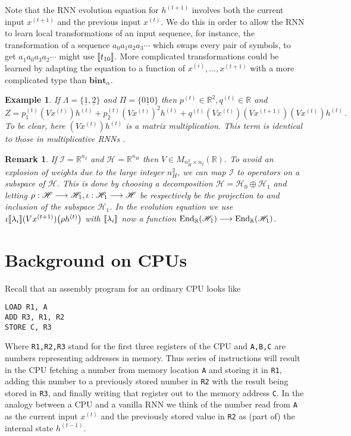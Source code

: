 \documentclass[english,letter paper,12pt,leqno]{article}
\theoremstyle{example}
\newtheorem{example}[theorem]{Example}
\newtheorem{remark}[theorem]{Remark}
\numberwithin{equation}{section}
\DeclareMathOperator{\End}{End}
\begin{document}
Note that the RNN evolution equation for $h^{(t+1)}$ involves both the current input $x^{(t+1)}$ and the previous input $x^{(t)}$. We do this in order to allow the RNN to learn local transformations of an input sequence, for instance, the transformation of a sequence $a_0 a_1 a_2 a_3 \cdots$ which swaps every pair of symbols, to get $a_1 a_0 a_3 a_2 \cdots$ might use $\llbracket t_{10} \rrbracket$. More complicated transformations could be learned by adapting the equation to a function of $x^{(i)}, \ldots, x^{(t+1)}$ with a more complicated type than $\textbf{bint}_\alpha$.

\begin{example} If $\Lambda = \{ \underline{1}, \underline{2} \}$ and $\Pi = \{ \underline{010} \}$ then $p^{(t)} \in \mathbb{R}^2, q^{(t)} \in \mathbb{R}$ and
\[
Z = p_1^{(t)}( V x^{(t)} )h^{(t)} + p_2^{(t)} ( V x^{(t)} )^2 h^{(t)} + q^{(t)} (Vx^{(t)})(Vx^{(t+1)})(Vx^{(t)})h^{(t)}\,.
\]
To be clear, here $(Vx^{(t)}) h^{(t)}$ is a matrix multiplication. This term is identical to those in multiplicative RNNs \cite{??}.
\end{example}

\begin{remark} If $\mathscr{I} = \mathbb{R}^{n_I}$ and $\mathscr{H} = \mathbb{R}^{n_H}$ then $V \in M_{n_H^2 \times n_I}(\mathbb{R})$. To avoid an explosion of weights due to the large integer $n_H^2$, we can map $\mathscr{I}$ to operators on a subspace of $\mathscr{H}$. This is done by choosing a decomposition $\mathscr{H} = \mathscr{H}_0 \oplus \mathscr{H}_1$ and letting $\rho: \mathscr{H} \longrightarrow \mathscr{H}_1, \iota: \mathscr{H}_1 \longrightarrow \mathscr{H}$ be respectively be the projection to and inclusion of the subspace $\mathscr{H}_1$. In the evolution equation we use $\iota \llbracket \lambda_i \rrbracket( Vx^{(t+1)} )\big( \rho h^{(t)} \big)$ with $\llbracket \lambda_i \rrbracket$ now a function $\End_{\mathbb{R}}(\mathscr{H}_1) \lto \End_{\mathbb{R}}(\mathscr{H}_1)$.
\end{remark}

\newpage

\appendix

\section{Background on CPUs}\label{section:appendix_cpu}

Recall that an assembly program for an ordinary CPU looks like
\begin{verbatim}
LOAD R1, A
ADD R3, R1, R2
STORE C, R3
\end{verbatim}
Where \verb+R1,R2,R3+ stand for the first three registers of the CPU and \verb+A,B,C+ are numbers representing addresses in memory. Thus series of instructions will result in the CPU fetching a number from memory location \verb+A+ and storing it in \verb+R1+, adding this number to a previously stored number in \verb+R2+ with the result being stored in \verb+R3+, and finally writing that register out to the memory address \verb+C+. In the analogy between a CPU and a vanilla RNN we think of the number read from \verb+A+ as the current input $x^{(t)}$ and the previously stored value in \verb+R2+ as (part of) the internal state $h^{(t-1)}$.
\end{document}
